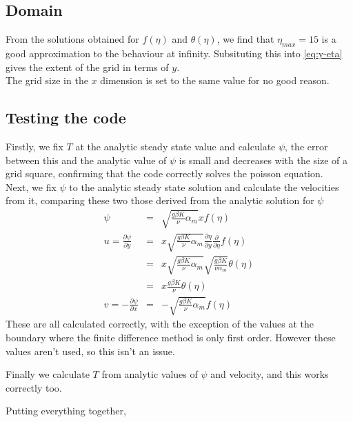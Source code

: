\documentclass{article}
\begin{document}
\subsection{Domain}
From the solutions obtained for $f(\eta)$ and $\theta(\eta)$, we find that $\eta_{max} = 15$ is a good approximation to the behaviour at infinity. Subsituting this into \eqref{eq:y-eta} gives the extent of the grid in terms of $y$. \\

The grid size in the $x$ dimension is set to the same value for no good reason.

\subsection{Testing the code}
Firstly, we fix $T$ at the analytic steady state value and calculate $\psi$, the error between this and the analytic value of $\psi$ is small and decreases with the size of a grid square, confirming that the code correctly solves the poisson equation. \\

Next, we fix $\psi$ to the analytic steady state solution and calculate the velocities from it, comparing these two those derived from the analytic solution for $\psi$
\begin{eqnarray}
\psi &=& \sqrt{\frac{g \beta K}{\nu} \alpha_m} x f(\eta) \\
u = \frac{\partial \psi}{\partial y} &=& x \sqrt{\frac{g \beta K}{\nu} \alpha_m} \frac{\partial \eta}{\partial y} \frac{\partial}{\partial \eta} f(\eta) \\
&=& x \sqrt{\frac{g \beta K}{\nu} \alpha_m} \sqrt{\frac{g \beta K}{\nu  \alpha_m} } \theta(\eta) \\
&=&x \frac{g \beta K}{\nu} \theta(\eta) \\
v = -  \frac{\partial \psi}{\partial x} &=& - \sqrt{\frac{g \beta K}{\nu} \alpha_m} f(\eta)
\end{eqnarray}
These are all calculated correctly, with the exception of the values at the boundary where the finite difference method is only first order. However these values aren't used, so this isn't an issue.

Finally we calculate $T$ from analytic values of $\psi$ and velocity, and this works correctly too.

Putting everything together, 
\end{document}
